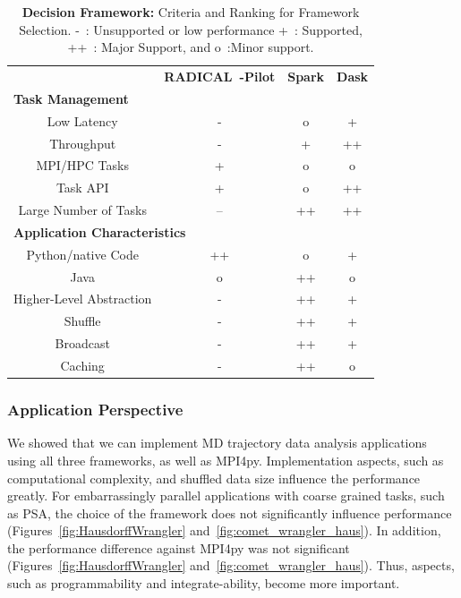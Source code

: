 \begin{table}[t]
    \centering
    \begin{tabular}{@{}cccc@{}}
        \toprule
        &\textbf{RADICAL~-Pilot}     &\textbf{Spark} &\textbf{Dask}\\
        \multicolumn{4}{l}{\textbf{Task Management}} \\
        \midrule
        Low Latency   &- &o &+\\
        Throughput    &- &+ &++\\
        MPI/HPC Tasks &+ &o &o\\
        Task API   &+ &o &++\\
        Large Number of Tasks   &-- &++ &++\\\hline
        \multicolumn{4}{l}{\textbf{Application Characteristics}}\\\midrule
        Python/native Code &++ &o &+\\
        Java               &o &++ &o\\
        Higher-Level Abstraction &- &++ &+\\
        Shuffle                  &- &++ &+\\
        Broadcast                &- &++ &+\\
        Caching                  &- &++ &o\\
        \bottomrule
    \end{tabular}
    \caption{\textbf{Decision Framework:} Criteria and Ranking for Framework Selection. -~: Unsupported or low performance
        +~: Supported, ++~: Major Support, and o~:Minor support.\label{tab:framework}}
\end{table}

\subsubsection{Application Perspective}
We showed that we can implement MD trajectory data analysis applications using all three frameworks, as well as MPI4py.
Implementation aspects, such as computational complexity, and shuffled data size influence the performance greatly.
For embarrassingly parallel applications with coarse grained tasks, such as PSA, the choice of the framework does not significantly influence performance (Figures~\ref{fig:HausdorffWrangler} and~\ref{fig:comet_wrangler_haus}).
In addition, the performance difference against MPI4py was not significant (Figures~\ref{fig:HausdorffWrangler} and~\ref{fig:comet_wrangler_haus}).
Thus, aspects, such as programmability and integrate-ability, become more important.

